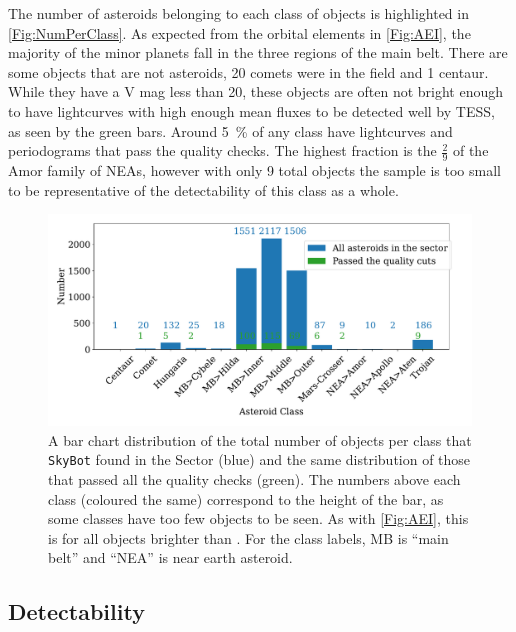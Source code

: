 \documentclass{UCreport}
\begin{document}
The number of asteroids belonging to each class of objects is highlighted in \autoref{Fig:NumPerClass}. 
As expected from the orbital elements in \autoref{Fig:AEI}, the majority of the minor planets fall in the three regions of the main belt. 
There are some objects that are not asteroids, 20 comets were in the field and 1 centaur.
While they have a V mag less than 20, these objects are often not bright enough to have lightcurves with high enough mean fluxes to be detected well by TESS, as seen by the green bars.
Around \qty{5}{\percent} of any class have lightcurves and periodograms that pass the quality checks. 
The highest fraction is the $\frac29$ of the Amor family of NEAs, however with only 9 total objects the sample is too small to be representative of the detectability of this class as a whole.


\begin{figure}
  \centering
  \includegraphics[width=\textwidth]{../OzData/classesBarqualCut.pdf}
  \caption[Class distribution]{A bar chart distribution of the total number of objects per class that \texttt{SkyBot} found in the Sector (blue) and the same distribution of those that passed all the quality checks (green). 
  The numbers above each class (coloured the same) correspond to the height of the bar, as some classes have too few objects to be seen.
  As with \autoref{Fig:AEI}, this is for all objects brighter than \unit{\mag}.
  For the class labels, MB is ``main belt'' and ``NEA'' is near earth asteroid.}
  \label{Fig:NumPerClass}
\end{figure}

\subsection{Detectability}
\end{document}
